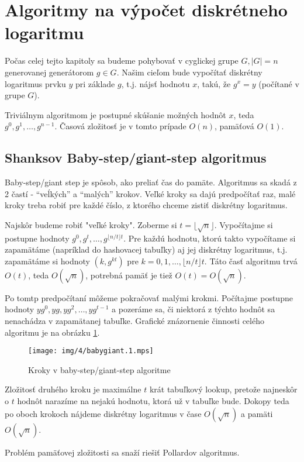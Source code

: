 \section{Algoritmy na výpočet diskrétneho logaritmu}
Počas celej tejto kapitoly sa budeme pohybovať v cyglickej grupe 
$G, |G|=n$ generovanej generátorom $g \in G$.
Našim cieľom bude vypočítať diskrétny logaritmus prvku $y$
pri základe $g$, t.j. nájsť hodnotu $x$, takú, že $g^x=y$ (počítané
v grupe $G$).


Triviálnym algoritmom je postupné skúšanie možných hodnôt $x$, teda
$g^0,g^1,\dots,g^{n-1}$.
Časová zložitosť je v tomto prípade $O(n)$, pamäťová $O(1)$.

\subsection{Shanksov Baby-step/giant-step algoritmus}
Baby-step/giant step je spôsob, ako preliať čas do pamäte.
Algoritmus sa skadá z 2 častí - ``veĺkých'' a ``malých'' krokov.
Veľké kroky sa dajú predpočítať raz, malé kroky treba robiť pre každé
číslo, z ktorého chceme zistiť diskrétny logaritmus.

Najskôr budeme robiť "veľké kroky".
Zoberme si $t=\lfloor \sqrt{n} \rfloor$.
Vypočítajme si postupne hodnoty $g^0,g^t,\dots,g^{\lfloor n/t \rfloor t}$.
Pre každú hodnotu, ktorú takto vypočítame si zapamätáme (napríklad do
hashovacej tabuľky) aj jej diskrétny logaritmus, t.j. zapamätáme si hodnoty
$(k,g^{kt})$ pre $k=0,1,\dots,\lfloor n/t \rfloor t$.
Táto časť algoritmu trvá $O(t)$, teda $O(\sqrt{n})$, potrebná pamäť je
tiež $O(t)=O(\sqrt{n})$.

Po tomtp predpočítaní môžeme pokračovať malými krokmi.
Počítajme postupne hodnoty $y g^0,yg,yg^2,\dots, yg^{t-1}$ a pozeráme sa,
či niektorá z týchto hodnôt sa nenachádza v zapamätanej tabuľke.
Grafické znázornenie činnosti celého algoritmu je na obrázku
\ref{fig:babygiant}.
\begin{figure}[h]
    \centering
    \texttt{[image: img/4/babygiant.1.mps]}
    \label{fig:babygiant}
    \caption{Kroky v baby-step/giant-step algoritme}
\end{figure}

Zložitosť druhého kroku je maximálne $t$ krát tabuľkový lookup, pretože
najneskôr o $t$ hodnôt narazíme na nejakú hodnotu, ktorá už v tabuľke bude.
Dokopy teda po oboch krokoch nájdeme diskrétny logaritmus
v čase $O(\sqrt{n})$ a pamäti $O(\sqrt{n})$.

Problém pamäťovej zložitosti sa snaží riešiť Pollardov algoritmus.

